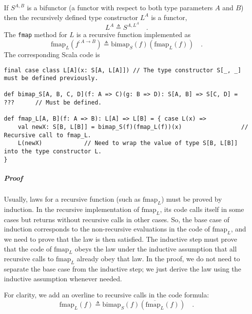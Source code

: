 If $S^{A,B}$ is a bifunctor (a functor with respect to both type
parameters $A$ and $B$) then the recursively defined type constructor
$L^{A}$ is a functor,
\[
L^{A}\triangleq S^{A,L^{A}}\quad.
\]
The \lstinline!fmap! method for $L$ is a recursive function implemented
as
\begin{equation}
\text{fmap}_{L}(f^{:A\rightarrow B})\triangleq\text{bimap}_{S}(f)(\text{fmap}_{L}(f))\quad.\label{eq:def-recursive-functor-fmap}
\end{equation}
The corresponding Scala code is
\begin{lstlisting}
final case class L[A](x: S[A, L[A]]) // The type constructor S[_, _] must be defined previously.

def bimap_S[A, B, C, D](f: A => C)(g: B => D): S[A, B] => S[C, D] = ???      // Must be defined.

def fmap_L[A, B](f: A => B): L[A] => L[B] = { case L(x) =>
    val newX: S[B, L[B]] = bimap_S(f)(fmap_L(f))(x)                 // Recursive call to fmap_L.
    L(newX)            // Need to wrap the value of type S[B, L[B]] into the type constructor L.
}
\end{lstlisting}


\subparagraph{Proof}

Usually, laws for a recursive
function (such as $\text{fmap}_{L}$) must be proved by induction.
In the recursive implementation of $\text{fmap}_{L}$, its code calls
itself in some cases but returns without recursive calls in other
cases. So, the base case of induction corresponds to the non-recursive
evaluations in the code of $\text{fmap}_{L}$, and we need to prove
that the law is then satisfied. The inductive step must prove that
the code of $\text{fmap}_{L}$ obeys the law under the inductive assumption
that all recursive calls to $\text{fmap}_{L}$ already obey that law.
In the proof, we do not need to separate the base case from the inductive
step; we just derive the law using the inductive assumption whenever
needed.

For clarity, we add an overline to recursive calls in the code formula:
\[
\text{fmap}_{L}(f)\triangleq\text{bimap}_{S}(f)(\overline{\text{fmap}_{L}}(f))\quad.
\]

